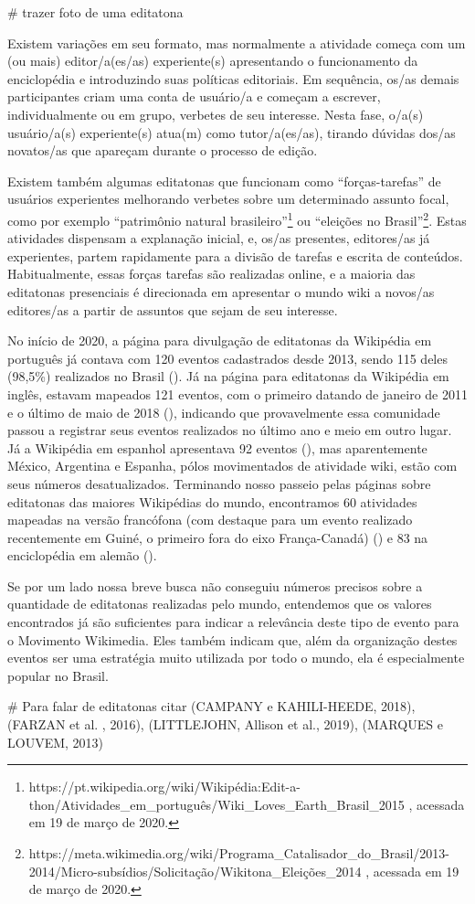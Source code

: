 # trazer foto de uma editatona

Existem variações em seu formato, mas normalmente a atividade começa com um (ou mais) editor/a(es/as) experiente(s) apresentando o funcionamento da enciclopédia e introduzindo suas políticas editoriais. Em sequência, os/as demais participantes criam uma conta de usuário/a e começam a escrever, individualmente ou em grupo, verbetes de seu interesse. Nesta fase, o/a(s) usuário/a(s) experiente(s) atua(m) como tutor/a(es/as), tirando dúvidas dos/as novatos/as que apareçam durante o processo de edição.

Existem também algumas editatonas que funcionam como ``forças-tarefas'' de usuários experientes melhorando verbetes sobre um determinado assunto focal, como por exemplo ``patrimônio natural brasileiro''\footnote{https://pt.wikipedia.org/wiki/Wikipédia:Edit-a-thon/Atividades\_em\_português/Wiki\_Loves\_Earth\_Brasil\_2015 , acessada em 19 de março de 2020.} ou ``eleições no Brasil''\footnote{https://meta.wikimedia.org/wiki/Programa\_Catalisador\_do\_Brasil/2013-2014/Micro-subsídios/Solicitação/Wikitona\_Eleições\_2014 , acessada em 19 de março de 2020.}. Estas atividades dispensam a explanação inicial, e, os/as presentes, editores/as já experientes, partem rapidamente para a divisão de tarefas e escrita de conteúdos. Habitualmente, essas forças tarefas são realizadas online, e a maioria das editatonas presenciais é direcionada em apresentar o mundo wiki a novos/as editores/as a partir de assuntos que sejam de seu interesse.

No início de 2020, a página para divulgação de editatonas da Wikipédia em português já contava com 120 eventos cadastrados desde 2013, sendo 115 deles (98,5\%) realizados no Brasil (). Já na página para editatonas da Wikipédia em inglês, estavam mapeados 121 eventos, com o primeiro datando de janeiro de 2011 e o último de maio de 2018 (), indicando que provavelmente essa comunidade passou a registrar seus eventos realizados no último ano e meio em outro lugar. Já a Wikipédia em espanhol apresentava 92 eventos (), mas aparentemente México, Argentina e Espanha, pólos movimentados de atividade wiki, estão com seus números desatualizados. Terminando nosso passeio pelas páginas sobre editatonas das maiores Wikipédias do mundo, encontramos 60 atividades mapeadas na versão francófona (com destaque para um evento realizado recentemente em Guiné, o primeiro fora do eixo França-Canadá) () e 83 na enciclopédia em alemão ().

Se por um lado nossa breve busca não conseguiu números precisos sobre a quantidade de editatonas realizadas pelo mundo, entendemos que os valores encontrados já são suficientes para indicar a relevância deste tipo de evento para o Movimento Wikimedia. Eles também indicam que, além da organização destes eventos ser uma estratégia muito utilizada por todo o mundo, ela é especialmente popular no Brasil.

# Para falar de editatonas citar (CAMPANY e KAHILI-HEEDE, 2018), (FARZAN et al. , 2016), (LITTLEJOHN, Allison et al., 2019), (MARQUES e LOUVEM, 2013)

